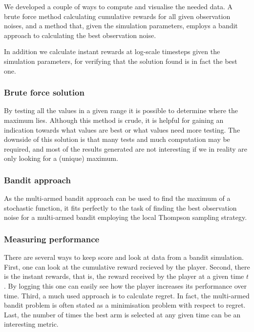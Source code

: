 We developed a couple of ways to compute and visualise the needed data.
A brute force method calculating cumulative rewards for all given observation noises, and a method that, given the simulation parameters, employs a bandit approach to calculating the best observation noise.

In addition we calculate instant rewards at log-scale timesteps given the simulation parameters, for verifying that the solution found is in fact the best one.

\subsubsection{Brute force solution}

By testing all the values in a given range it is possible to determine where the maximum lies.
Although this method is crude, it is helpful for gaining an indication towards what values are best or what values need more testing.
The downside of this solution is that many tests and much computation may be required, and most of the results generated are not interesting if we in reality are only looking for a (unique) maximum.

\subsubsection{Bandit approach}

As the multi-armed bandit approach can be used to find the maximum of a
stochastic function, it fits perfectly to the task of finding the best
observation noise for a multi-armed bandit employing the local Thompson
sampling strategy.

\subsubsection{Measuring performance}

There are several ways to keep score and look at data from a bandit simulation.
First, one can look at the cumulative reward recieved by the player.
Second, there is the instant rewards, that is, the reward received by the player at a given time $t$.
By logging this one can easily see how the player increases its performance over time.
Third, a much used approach is to calculate regret.
In fact, the multi-armed bandit problem is often stated as a minimisation problem with respect to regret.
Last, the number of times the best arm is selected at any given time can be an interesting metric.


